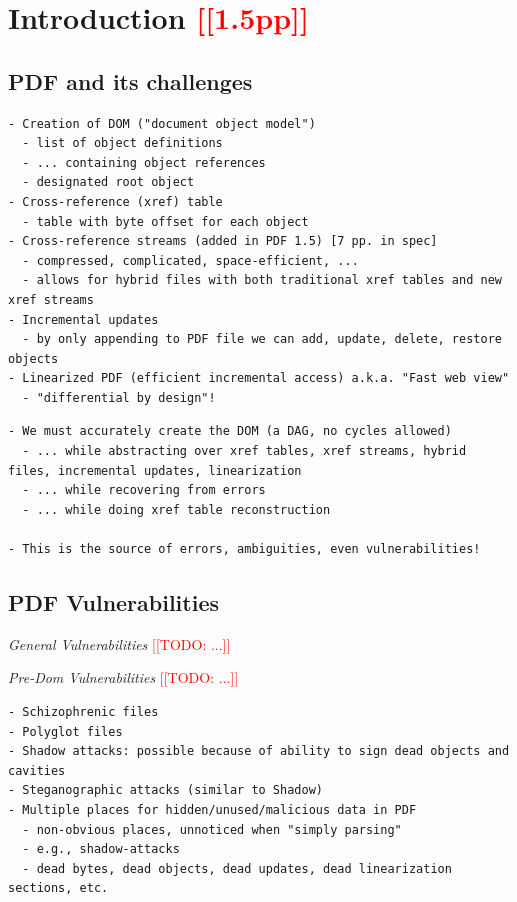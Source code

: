 \documentclass[conference,12pt]{IEEEtran}
\newcommand{\note}[1]{\noteYes{#1}}
\newcommand{\noteYes}[1]{\textcolor{red}{[[#1]]}}
\newcommand{\todo}[1]{\note{TODO: #1}}
\begin{document}
\section{Introduction \note{1.5pp}}
\label{sec:intro}

\subsection{PDF and its challenges}
\label{sec:pdf-challenges}

\begin{lstlisting}[style=meta]
- Creation of DOM ("document object model")
  - list of object definitions
  - ... containing object references
  - designated root object
- Cross-reference (xref) table
  - table with byte offset for each object
- Cross-reference streams (added in PDF 1.5) [7 pp. in spec]
  - compressed, complicated, space-efficient, ...
  - allows for hybrid files with both traditional xref tables and new xref streams
- Incremental updates
  - by only appending to PDF file we can add, update, delete, restore objects
- Linearized PDF (efficient incremental access) a.k.a. "Fast web view"
  - "differential by design"!
\end{lstlisting}

\begin{lstlisting}[style=meta]
- We must accurately create the DOM (a DAG, no cycles allowed)
  - ... while abstracting over xref tables, xref streams, hybrid files, incremental updates, linearization
  - ... while recovering from errors
  - ... while doing xref table reconstruction

- This is the source of errors, ambiguities, even vulnerabilities!
\end{lstlisting}

\subsection{PDF Vulnerabilities}

\emph{General Vulnerabilities} \todo{...}

\emph{Pre-Dom Vulnerabilities} \todo{...}

\begin{lstlisting}[style=meta]
- Schizophrenic files
- Polyglot files
- Shadow attacks: possible because of ability to sign dead objects and cavities
- Steganographic attacks (similar to Shadow)
- Multiple places for hidden/unused/malicious data in PDF
  - non-obvious places, unnoticed when "simply parsing"
  - e.g., shadow-attacks
  - dead bytes, dead objects, dead updates, dead linearization sections, etc.
\end{lstlisting}
\end{document}
